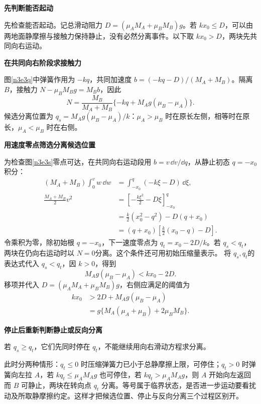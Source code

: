 \begin{solution}\textbf{先判断能否起动}\par\nobreak
先检查能否起动。记总滑动阻力 $D=(\mu_AM_A+\mu_BM_B)g$。若 $kx_0\le D$，可以由两地面静摩擦与接触力保持静止，没有必然分离事件。以下取 $kx_0>D$，两块先共同向右运动。



\par\medskip{}\noindent\textbf{在共同向右阶段求接触力}\par\nobreak
图\ref{n3e3q}中弹簧作用为 $-kq$，共同加速度 $b=(-kq-D)/(M_A+M_B)$。隔离 $B$，接触力 $N-\mu_BM_Bg=M_Bb$，因此
\[N=\frac{M_B}{M_A+M_B}\{ -kq+M_Ag(\mu_B-\mu_A)\}.\]
候选分离位置为 $q_s=M_Ag(\mu_B-\mu_A)/k$：$\mu_A>\mu_B$ 时在原长左侧，相等时在原长，$\mu_A<\mu_B$ 时在右侧。



\par\medskip{}\noindent\textbf{用速度零点筛选分离候选位置}\par\nobreak
为检查图\ref{n3e3s}零点可达，在共同向右运动段用 $b=v\,\dd v/\dd q$，从静止初态 $q=-x_0$ 积分：
\begin{align*}
(M_A+M_B)\int_0^v w\,\dd w
&=\int_{-x_0}^{q}(-k\xi-D)\,\dd\xi,\\
\frac{M_A+M_B}{2}v^2
&=\left[-\frac{k\xi^2}{2}-D\xi\right]_{-x_0}^{q}\\
&=\frac k2(x_0^2-q^2)-D(q+x_0)\\
&=(q+x_0)\left[\frac k2(x_0-q)-D\right].
\end{align*}
令乘积为零，除初始根 $q=-x_0$，下一速度零点为 $q_t=x_0-2D/k$。若 $q_s<q_t$，两块在仍向右运动时以 $N=0$分离。这个条件还可用初始压缩量表示。
将 $q_s,q_t$的表达式代入 $q_s<q_t$，因 $k>0$，得到
\[
 M_Ag(\mu_B-\mu_A)<kx_0-2D.
\]
移项并代入 $D=(\mu_AM_A+\mu_BM_B)g$，右侧应满足的阈值为
\begin{align*}
 kx_0&>2D+M_Ag(\mu_B-\mu_A)\\
 &=g\{M_A(\mu_A+\mu_B)+2\mu_BM_B\}.
\end{align*}


\par\medskip{}\noindent\textbf{停止后重新判断静止或反向分离}\par\nobreak
若 $q_s\ge q_t$，它们先同时停在 $q_t$，不能继续用向右滑动方程求分离。

此时分两种情形：$q_t\le0$ 时压缩弹簧力已小于总静摩擦上限，可停住；$q_t>0$ 时弹簧向左拉 $A$，若 $kq_t\le\mu_AM_Ag$ 也可停住，若 $kq_t>\mu_AM_Ag$，则 $A$ 开始向左返回而 $B$ 可静止，两块在转向点 $q_t$ 分离。等号属于临界状态，是否进一步运动要看扰动及所取静摩擦约定。这样才把候选位置、停止与反向分离三个过程区别开。

\end{solution}


